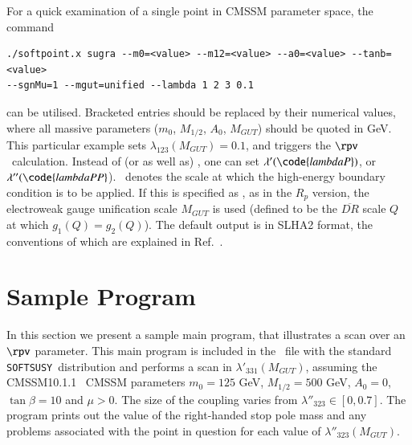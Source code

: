 \documentclass[final,3p,times,pdflatex]{elsarticle}
\def\SOFTSUSY{{\tt SOFTSUSY}}
\begin{document}
For a quick examination of a single point in CMSSM parameter space, the
command  
\small
\begin{verbatim}
./softpoint.x sugra --m0=<value> --m12=<value> --a0=<value> --tanb=<value>
--sgnMu=1 --mgut=unified --lambda 1 2 3 0.1
\end{verbatim}
\normalsize
can be utilised. Bracketed entries should be replaced by their numerical
values, where all massive parameters ($m_0$, $M_{1/2}$, $A_0$, $M_{GUT}$)
should be 
quoted in GeV. This particular example sets $\lambda_{123}(M_{GUT})=0.1$, and
triggers the $\rpv$~calculation. Instead of (or as well as)
, one can set $\lambda'(\code{lambdaP})$, or
$\lambda''(\code{lambdaPP}$). 
~denotes the scale at which the high-energy boundary condition is to
be applied. 
If this is 
specified as , as in the $R_p$ version, the electroweak gauge
unification scale
$M_{GUT}$ is used (defined to be the $\overline{DR}$ scale $Q$ at which $g_1(Q) =
g_2(Q)$). The default output is in SLHA2 format, the conventions of which are
explained in Ref.~\cite{Allanach:2008qq}. 


\section{Sample Program \label{sec:prog}}

In this section we present a sample main program, that illustrates 
a scan over an $\rpv$ parameter. This main program
is included in the  
~file with the standard \SOFTSUSY~distribution and performs
a scan in $\lambda'_{331}(M_{GUT})$, assuming the CMSSM10.1.1~\cite{bench}
CMSSM parameters $m_0=125$ GeV, $M_{1/2}=500$ GeV, $A_0=0$, $\tan
\beta=10$ and $\mu>0$. The  
size of the coupling varies from $\lambda''_{323} \in [0 , 0.7 ]$.
The program prints out the value of the right-handed stop pole mass and any
problems 
associated with the point in question for each value of
$\lambda''_{323}(M_{GUT})$. 
\end{document}
